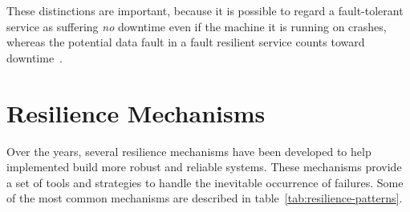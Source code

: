 These distinctions are important, because it is possible to regard a fault-tolerant service as suffering \textit{no} downtime even if the machine it is running on crashes, whereas the potential data fault in a fault resilient service counts toward downtime~\cite{bottomley2004fault}.


\section{Resilience Mechanisms}\label{sec:resilience-mechanisms}

Over the years, several resilience mechanisms have been developed to help implemented build more robust and reliable systems. These mechanisms provide a set of tools and strategies to handle the inevitable occurrence of failures. Some of the most common mechanisms are described in table~\ref{tab:resilience-patterns}.

